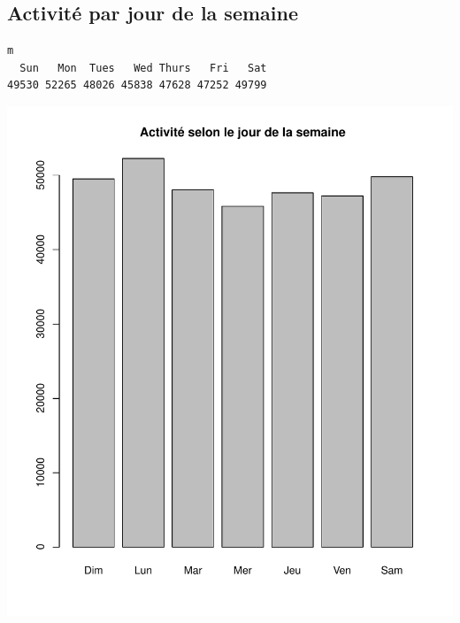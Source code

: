\documentclass[12pt,english,french,twoside]{book}\usepackage[]{graphicx}\usepackage[]{color}
\makeatletter
\def\maxwidth{ %
  \ifdim\Gin@nat@width>\linewidth
    \linewidth
  \else
    \Gin@nat@width
  \fi
}
\newenvironment{kframe}{%
 \def\at@end@of@kframe{}%
 \ifinner\ifhmode%
  \def\at@end@of@kframe{\end{minipage}}%
  \begin{minipage}{\columnwidth}%
 \fi\fi%
 \def\FrameCommand##1{\hskip\@totalleftmargin \hskip-\fboxsep
 \colorbox{shadecolor}{##1}\hskip-\fboxsep
     \hskip-\linewidth \hskip-\@totalleftmargin \hskip\columnwidth}%
 \MakeFramed {\advance\hsize-\width
   \@totalleftmargin\z@ \linewidth\hsize
   \@setminipage}}%
 {\par\unskip\endMakeFramed%
 \at@end@of@kframe}
\newenvironment{knitrout}{}{} %
\makeatother
\begin{document}
\subsection*{Activité par jour de la semaine}
\begin{knitrout}
\color{fgcolor}\begin{kframe}
\begin{verbatim}
m
  Sun   Mon  Tues   Wed Thurs   Fri   Sat 
49530 52265 48026 45838 47628 47252 49799 
\end{verbatim}
\end{kframe}
\includegraphics[width=\maxwidth]{figure/activite_semaine} 

\end{knitrout}
\end{document}
